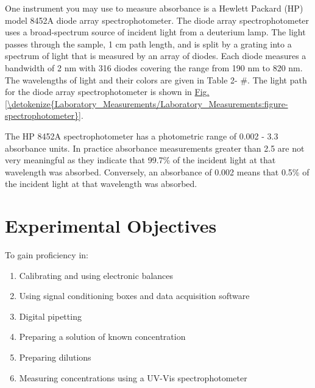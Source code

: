 \documentclass[letterpaper,10pt,english]{sphinxmanual}
\begin{document}
One instrument you may use to measure absorbance is a Hewlett Packard (HP) model 8452A diode array spectrophotometer. The diode array spectrophotometer uses a broad-spectrum source of incident light from a deuterium lamp. The light passes through the sample, 1 cm path length, and is split by a grating into a spectrum of light that is measured by an array of diodes. Each diode measures a bandwidth of 2 nm with 316 diodes covering the range from 190 nm to 820 nm. The wavelengths of light and their colors are given in Table 2- \#. The light path for the diode array spectrophotometer is shown in \hyperref[\detokenize{Laboratory_Measurements/Laboratory_Measurements:figure-spectrophotometer}]{Fig.\@ \ref{\detokenize{Laboratory_Measurements/Laboratory_Measurements:figure-spectrophotometer}}}.

The HP 8452A spectrophotometer has a photometric range of 0.002 - 3.3 absorbance units. In practice absorbance measurements greater than 2.5 are not very meaningful as they indicate that 99.7\% of the incident light at that wavelength was absorbed. Conversely, an absorbance of 0.002 means that 0.5\% of the incident light at that wavelength was absorbed.


\section{Experimental Objectives}
\label{\detokenize{Laboratory_Measurements/Laboratory_Measurements:experimental-objectives}}\label{\detokenize{Laboratory_Measurements/Laboratory_Measurements:heading-laboratory-measurements-and-procedures-experimental-objectives}}
To gain proficiency in:
\begin{enumerate}
\item {} 
Calibrating and using electronic balances

\item {} 
Using signal conditioning boxes and data acquisition software

\item {} 
Digital pipetting

\item {} 
Preparing a solution of known concentration

\item {} 
Preparing dilutions

\item {} 
Measuring concentrations using a UV-Vis spectrophotometer

\end{enumerate}
\end{document}
